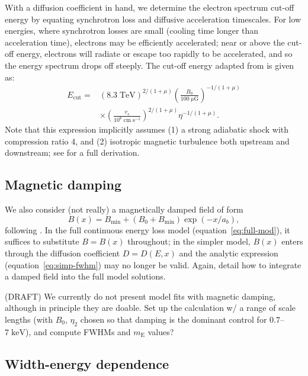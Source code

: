 \documentclass[iop, apj, numberedappendix, twocolappendix]{emulateapj}
\newcommand*{\mt}{\mathrm}
\newcommand*{\unit}[1]{\;\mt{#1}}  %
\newcommand*{\mE}{m_\mt{E}}
\newcommand*{\Ecut}{E_{\mt{cut}}}
\begin{document}
With a diffusion coefficient in hand, we determine the electron spectrum
cut-off energy by equating synchrotron loss and diffusive acceleration
timescales.  For low energies, where synchrotron losses are small (cooling time
longer than acceleration time), electrons may be efficiently accelerated; near
or above the cut-off energy, electrons will radiate or escape too rapidly to be
accelerated, and so the energy spectrum drops off steeply.
The cut-off energy adapted from \citet{parizot2006} is given as:
\begin{align}
    \Ecut =
        &\left(8.3\unit{TeV}\right)^{2/(1+\mu)}
        \left(\frac{B_0}{100 \unit{\mu G}}\right)^{-1/(1+\mu)} \nonumber \\
        &\times \left(\frac{v_s}{10^8 \unit{cm\;s^{-1}}}\right)^{2/(1+\mu)}
        \eta^{-1 / (1+\mu)} .
\end{align}
Note that this expression implicitly assumes (1) a strong adiabatic shock with
compression ratio 4, and (2) isotropic magnetic turbulence both upstream and
downstream; see \citet{parizot2006} for a full derivation.


\subsection{Magnetic damping}

We also consider (not really) a magnetically damped field of form
\begin{equation}
    B(x) = B_{\mt{min}} + \left(B_0 + B_{\mt{min}}\right) \exp\left(-x / a_b\right) ,
\end{equation}
following \citet{pohl2005}.
In the full continuous energy loss model (equation~\eqref{eq:full-mod}), it
suffices to substitute $B = B(x)$ throughout; in the simpler model, $B(x)$
enters through the diffusion coefficient $D = D(E,x)$ and the analytic
expression (equation~\eqref{eq:simp-fwhm}) may no longer be valid.
Again,  detail how to integrate a damped field into the
full model solutions.

(DRAFT) We currently do not present model fits with magnetic damping, although
in principle they are doable.  Set up the calculation w/ a range of scale
lengths (with $B_0$, $\eta_2$ chosen so that damping is the dominant control
for $0.7$--$7 \unit{keV}$), and compute FWHMs and $\mE$ values?

\subsection{Width-energy dependence}
\end{document}
